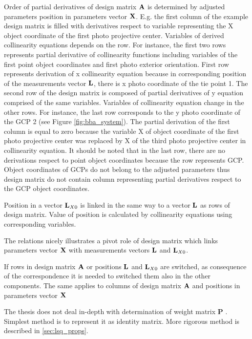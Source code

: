 \documentclass[a4paper,12pt]{article}
\newcommand{\ematr}[1]{%
{\bf #1}%
}
\newcommand{\evect}[1]{%
{\bf #1}%
}
\begin{document}
Order of partial derivatives of design matrix $\evect{A}$  is determined by adjusted parameters position in 
parameters vector $\evect{X}$. E.g. the first column of the example design matrix is filled with derivatives respect 
to variable representing the  X object coordinate of the first photo projective center. Variables of derived collinearity equations
depends on the row. For instance, the first two rows represents partial derivative of collinearity functions 
including variables of the first point object coordinates  and first photo exterior orientation.  First row represents  
derivation of x collinearity equation because in corresponding position of the measurements vector $\evect{L}$, there is 
x photo coordinate of the tie point 1. The second row of the design matrix is composed of 
partial derivatives of y equation comprised of the same variables. 
Variables of collinearity equation change in the other rows. For instance, the last row corresponds to the 
y photo coordinate of the GCP 2 (see Figure \ref{fig:bba_system}). The partial derivation of the first column is equal 
to zero because the variable X of object coordinate of the first photo projective center was replaced 
by X of the third photo projective center in collinearity equation. 
It should be noted that in the last row, there are no derivations 
respect to point object coordinates because the row represents GCP. Object coordinates of GCPs do not 
belong to the adjusted parameters thus design matrix do not contain column representing partial 
derivatives respect to the GCP object coordinates.


Position in a vector $\evect{L}_{X0}$ is linked in the same way to a vector $\evect{L}$ as rows of design matrix.
Value of position is calculated by collinearity equations using corresponding variables.

The relations nicely illustrates a pivot role of design matrix which links parameters vector $\evect{X}$ 
with measurements vectors $\evect{L}$ and $\evect{L}_{X0}$.

If rows in design matrix $\evect{A}$ or positions $\evect{L}$ and $\evect{L}_{X0}$ are switched,
as consequence of the correspondence it is needed to switched them also in the other components. 
The same applies to columns  of design matrix $\evect{A}$  and positions in parameters vector $\evect{X}$

The thesis does not deal in-depth with determination of weight matrix \ematr{P}. 
Simplest method is to represent it as identity matrix. More rigorous method is described in \ref{sec:lsq_props}. 
\end{document}
